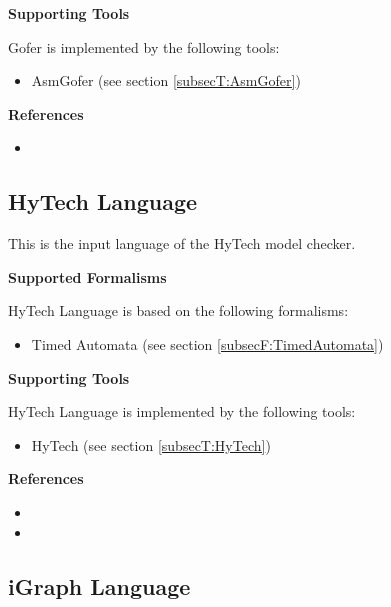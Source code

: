 \textbf{Supporting Tools}

Gofer is implemented by the following tools:
\begin{itemize}
	\item AsmGofer (see section \ref{subsecT:AsmGofer})
\end{itemize}


\textbf{References}
\begin{itemize}
	
\item {}
\end{itemize}



\subsection{HyTech Language}
\label{subsecL:HyTechLanguage}


This is the input language of the HyTech model checker.

\textbf{Supported Formalisms}

HyTech Language is based on the following formalisms:
\begin{itemize}
	\item Timed Automata (see section \ref{subsecF:TimedAutomata})
\end{itemize}


\textbf{Supporting Tools}

HyTech Language is implemented by the following tools:
\begin{itemize}
	\item HyTech (see section \ref{subsecT:HyTech})
\end{itemize}


\textbf{References}
\begin{itemize}
	
\item {}
	
\item {}
\end{itemize}



\subsection{iGraph Language}
\label{subsecL:iGraphLanguage}


